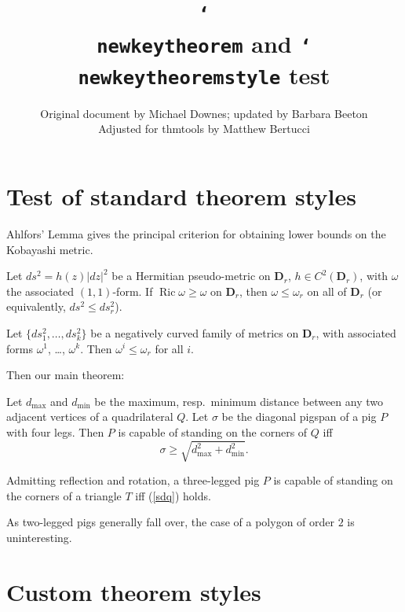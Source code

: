 \documentclass{article}
\title{\texttt{\char`\\ newkeytheorem} and \texttt{\char`\\ newkeytheoremstyle} test}
\author{%
  Original document by Michael Downes; updated by Barbara Beeton\\
  Adjusted for \textsf{thmtools} by Matthew Bertucci
  }
\let\lvert=|\let\rvert=|
\newcommand{\Ric}{\mathop{\mathrm{Ric}}\nolimits}
\begin{document}
\maketitle

\section{Test of standard theorem styles}

Ahlfors' Lemma gives the principal criterion for obtaining lower bounds
on the Kobayashi metric.

\begin{Ahlfors}
Let $ds^2 = h(z)\lvert dz\rvert^2$ be a Hermitian pseudo-metric on
$\mathbf{D}_r$, $h\in C^2(\mathbf{D}_r)$, with $\omega$ the associated
$(1,1)$-form. If $\Ric\omega\geq\omega$ on $\mathbf{D}_r$,
then $\omega\leq\omega_r$ on all of $\mathbf{D}_r$ (or equivalently,
$ds^2\leq ds_r^2$).
\end{Ahlfors}

\begin{lem}
Let $\{ds_1^2,\dots,ds_k^2\}$ be a negatively curved family of metrics
on $\mathbf{D}_r$, with associated forms $\omega^1$, \dots, $\omega^k$.
Then $\omega^i \leq\omega_r$ for all $i$.
\end{lem}

Then our main theorem:
\begin{thm}\label{pigspan}
Let $d_{\max}$ and $d_{\min}$ be the maximum, resp.\ minimum distance
between any two adjacent vertices of a quadrilateral $Q$. Let $\sigma$
be the diagonal pigspan of a pig $P$ with four legs.
Then $P$ is capable of standing on the corners of $Q$ iff
\begin{equation}\label{sdq}
\sigma\geq \sqrt{d_{\max}^2+d_{\min}^2}.
\end{equation}
\end{thm}

\begin{cor}
Admitting reflection and rotation, a three-legged pig $P$ is capable of
standing on the corners of a triangle $T$ iff (\ref{sdq}) holds.
\end{cor}

\begin{rmk}
As two-legged pigs generally fall over, the case of a polygon of order
$2$ is uninteresting.
\end{rmk}

\section{Custom theorem styles}
\end{document}
